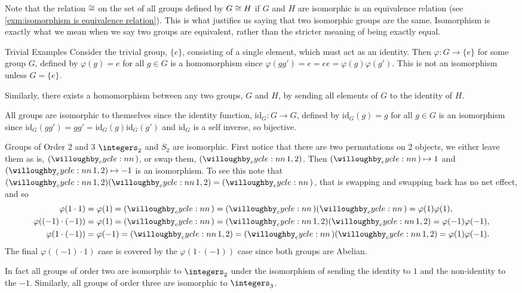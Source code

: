 Note that the relation \(\cong\) on the set of all groups defined by \(G \cong H\) if \(G\) and \(H\) are isomorphic is an equivalence relation (see \cref{exm:isomorphism is equivalence relation}).
This is what justifies us saying that two isomorphic groups are the same.
Isomorphism is exactly what we mean when we say two groups are equivalent, rather than the stricter meaning of being exactly equal.

\begin{exm}{Trivial Examples}{}
    Consider the trivial group, \(\{e\}\), consisting of a single element, which must act as an identity.
    Then \(\varphi\colon G \to \{e\}\) for some group \(G\), defined by \(\varphi(g) = e\) for all \(g \in G\) is a homomorphism since \(\varphi(gg') = e = ee = \varphi(g)\varphi(g')\).
    This is not an isomorphism unless \(G = \{e\}\).
    
    Similarly, there exists a homomorphism between any two groups, \(G\) and \(H\), by sending all elements of \(G\) to the identity of \(H\).
    
    All groups are isomorphic to themselves since the identity function, \(\mathrm{id}_G\colon G \to G\), defined by \(\mathrm{id}_G(g) = g\) for all \(g \in G\) is an isomorphism since \(\mathrm{id}_G(gg') = gg' = \mathrm{id}_G(g)\mathrm{id}_G(g')\) and \(\mathrm{id}_G\) is a self inverse, so bijective.
\end{exm}

\begin{exm}{Groups of Order 2 and 3}{}
    \(\integers_2\) and \(S_2\) are isomorphic.
    First notice that there are two permutations on 2 objects, we either leave them as is, \(\cycle{}\), or swap them, \(\cycle{1, 2}\).
    Then \(\cycle{} \mapsto 1\) and \(\cycle{1, 2} \mapsto -1\) is an isomorphism.
    To see this note that \(\cycle{1, 2}\cycle{1, 2} = \cycle{}\), that is swapping and swapping back has no net effect, and so
    \begin{align}
        \varphi(1 \cdot 1) &= \varphi(1) = \cycle{} = \cycle{}\cycle{} = \varphi(1)\varphi(1),\\
        \varphi((-1)\cdot (-1)) &= \varphi(1) = \cycle{} = \cycle{1, 2}\cycle{1, 2} = \varphi(-1)\varphi(-1),\\
        \varphi(1 \cdot (-1)) &= \varphi(-1) = \cycle{1, 2} = \cycle{}\cycle{1, 2} = \varphi(1)\varphi(-1).
    \end{align}
    The final \(\varphi((-1)\cdot 1)\) case is covered by the \(\varphi(1\cdot (-1))\) case since both groups are Abelian.
    
    In fact all groups of order two are isomorphic to \(\integers_2\) under the isomorphism of sending the identity to \(1\) and the non-identity to the \(-1\).
    Similarly, all groups of order three are isomorphic to \(\integers_3\).
\end{exm}

